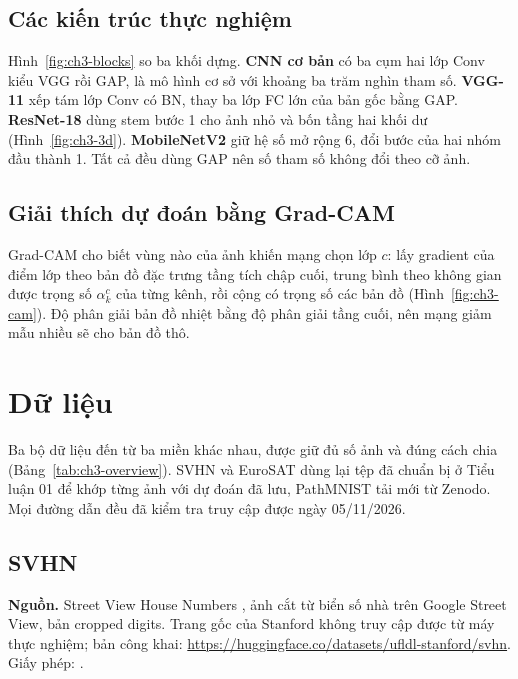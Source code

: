 
\subsection{Các kiến trúc thực nghiệm}
Hình~\ref{fig:ch3-blocks} so ba khối dựng. \textbf{CNN cơ bản} có ba cụm hai lớp Conv kiểu VGG rồi GAP, là mô hình cơ sở với khoảng ba trăm nghìn tham số. \textbf{VGG-11} xếp tám lớp Conv có BN, thay ba lớp FC lớn của bản gốc bằng GAP. \textbf{ResNet-18} dùng stem bước 1 cho ảnh nhỏ và bốn tầng hai khối dư (Hình~\ref{fig:ch3-3d}). \textbf{MobileNetV2} giữ hệ số mở rộng 6, đổi bước của hai nhóm đầu thành 1. Tất cả đều dùng GAP nên số tham số không đổi theo cỡ ảnh.


\subsection{Giải thích dự đoán bằng Grad-CAM}
Grad-CAM \cite{ch3-selvaraju2017} cho biết vùng nào của ảnh khiến mạng chọn lớp $c$: lấy gradient của điểm lớp theo bản đồ đặc trưng tầng tích chập cuối, trung bình theo không gian được trọng số $\alpha_k^c$ của từng kênh, rồi cộng có trọng số các bản đồ (Hình~\ref{fig:ch3-cam}). Độ phân giải bản đồ nhiệt bằng độ phân giải tầng cuối, nên mạng giảm mẫu nhiều sẽ cho bản đồ thô.


\section{Dữ liệu}
Ba bộ dữ liệu đến từ ba miền khác nhau, được giữ đủ số ảnh và đúng cách chia (Bảng~\ref{tab:ch3-overview}). SVHN và EuroSAT dùng lại tệp đã chuẩn bị ở Tiểu luận 01 để khớp từng ảnh với dự đoán đã lưu, PathMNIST tải mới từ Zenodo. Mọi đường dẫn đều đã kiểm tra truy cập được ngày 05/11/2026.


\subsection{SVHN}
\textbf{Nguồn.} Street View House Numbers \cite{ch3-netzer2011}, ảnh cắt từ biển số nhà trên Google Street View, bản cropped digits. Trang gốc của Stanford không truy cập được từ máy thực nghiệm; bản công khai: \url{https://huggingface.co/datasets/ufldl-stanford/svhn}. Giấy phép: .

